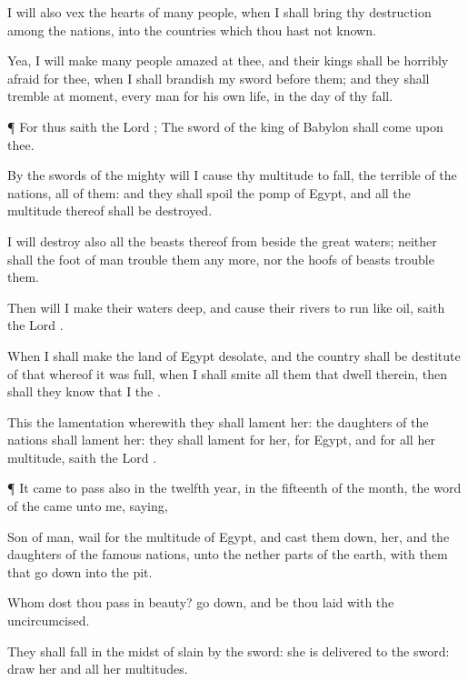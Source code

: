{I will also
vex the
hearts of
many
people, when I shall
bring thy
destruction among the
nations, into the
countries which thou hast not
known.

Yea, I will make
many
people
amazed at thee, and their
kings shall be
horribly
afraid for thee, when I shall
brandish my
sword before
them; and they shall
tremble at
{}
moment, every
man for his own
life, in the
day of thy
fall.


\par }{\PP {}¶ For thus
saith the
Lord
{}; The
sword of the
king of
Babylon shall
come upon thee.

By the
swords of the
mighty will I cause thy
multitude to
fall, the
terrible of the
nations, all of them: and they shall
spoil the
pomp of
Egypt, and all the
multitude thereof shall be
destroyed.

I will
destroy also all the
beasts thereof
from beside the
great
waters; neither shall the
foot of
man
trouble them any more, nor the
hoofs of
beasts
trouble them.

Then will I make their
waters
deep, and cause their
rivers to
run like
oil,
saith the
Lord
{}.

When I shall
make the
land of
Egypt
desolate, and the
country shall be
destitute of that whereof it was
full, when I shall
smite all them that
dwell therein, then shall they
know that I
{} the
{}.

This
{} the
lamentation wherewith they shall
lament her: the
daughters of the
nations shall
lament her: they shall
lament for her,
{} for
Egypt, and for all her
multitude,
saith the
Lord
{}.


\par }{\PP {}¶ It came to pass also in the
twelfth
year, in the
fifteenth
{} of the
month,
{} the
word of the
{} came unto me,
saying,

Son of
man,
wail for the
multitude of
Egypt, and cast them
down,
{} her, and the
daughters of the
famous
nations, unto the nether
parts of the
earth, with them that go
down into the
pit.

Whom dost thou pass in
beauty? go
down, and be thou
laid with the
uncircumcised.

They shall
fall in the
midst of
{}
slain by the
sword: she is
delivered to the
sword:
draw her and all her
multitudes.

}
